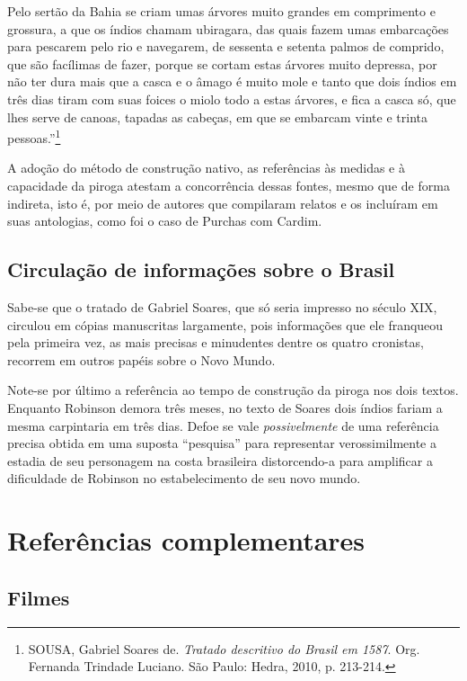 \documentclass{article}
\begin{document}
Pelo sertão da Bahia se criam umas árvores muito grandes em comprimento
e grossura, a que os índios chamam ubiragara, das quais fazem umas
embarcações para pescarem pelo rio e navegarem, de sessenta e setenta
palmos de comprido, que são facílimas de fazer, porque se cortam estas
árvores muito depressa, por não ter dura mais que a casca e o âmago é
muito mole e tanto que dois índios em três dias tiram com suas foices o
miolo todo a estas árvores, e fica a casca só, que lhes serve de canoas,
tapadas as cabeças, em que se embarcam vinte e trinta
pessoas.''\footnote{SOUSA, Gabriel Soares de. \emph{Tratado descritivo
  do Brasil em 1587}. Org. Fernanda Trindade Luciano. São Paulo: Hedra,
  2010, p. 213-214.}

A adoção do método de construção nativo, as referências às medidas e à
capacidade da piroga atestam a concorrência dessas fontes, mesmo que de
forma indireta, isto é, por meio de autores que compilaram relatos e os
incluíram em suas antologias, como foi o caso de Purchas com Cardim.

\subsection{Circulação de informações sobre o Brasil}

Sabe-se que o tratado de Gabriel Soares, que só seria impresso no século
XIX, circulou em cópias manuscritas largamente, pois informações que ele
franqueou pela primeira vez, as mais precisas e minudentes dentre os
quatro cronistas, recorrem em outros papéis sobre o Novo Mundo.

Note-se por último a referência ao tempo de construção da piroga nos
dois textos. Enquanto Robinson demora três meses, no texto de Soares
dois índios fariam a mesma carpintaria em três dias. Defoe se vale
\emph{possivelmente} de uma referência precisa obtida em uma suposta
``pesquisa'' para representar verossimilmente a estadia de seu
personagem na costa brasileira distorcendo-a para amplificar a
dificuldade de Robinson no estabelecimento de seu novo mundo.


\section{Referências complementares}


\subsection{Filmes}
\end{document}

